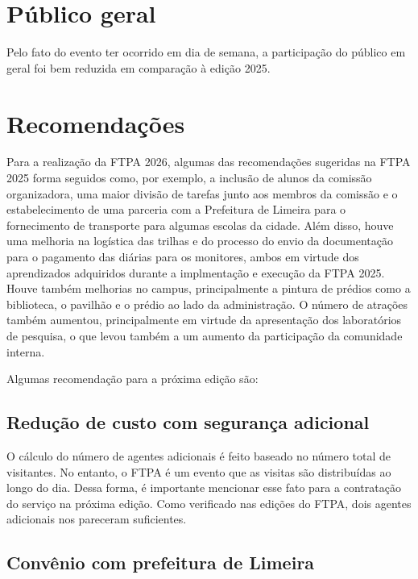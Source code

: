 \documentclass[
  letterpaper,
  DIV=11,
  numbers=noendperiod]{scrreprt}
\begin{document}
\chapter{Público geral}\label{puxfablico-geral}

Pelo fato do evento ter ocorrido em dia de semana, a participação do
público em geral foi bem reduzida em comparação à edição 2025.

\chapter{Recomendações}\label{recomendauxe7uxf5es-1}

Para a realização da FTPA 2026, algumas das recomendações sugeridas na
FTPA 2025 forma seguidos como, por exemplo, a inclusão de alunos da
comissão organizadora, uma maior divisão de tarefas junto aos membros da
comissão e o estabelecimento de uma parceria com a Prefeitura de Limeira
para o fornecimento de transporte para algumas escolas da cidade. Além
disso, houve uma melhoria na logística das trilhas e do processo do
envio da documentação para o pagamento das diárias para os monitores,
ambos em virtude dos aprendizados adquiridos durante a implmentação e
execução da FTPA 2025. Houve também melhorias no campus, principalmente
a pintura de prédios como a biblioteca, o pavilhão e o prédio ao lado da
administração. O número de atrações também aumentou, principalmente em
virtude da apresentação dos laboratórios de pesquisa, o que levou também
a um aumento da participação da comunidade interna.

Algumas recomendação para a próxima edição são:

\section{Redução de custo com segurança
adicional}\label{reduuxe7uxe3o-de-custo-com-seguranuxe7a-adicional}

O cálculo do número de agentes adicionais é feito baseado no número
total de visitantes. No entanto, o FTPA é um evento que as visitas são
distribuídas ao longo do dia. Dessa forma, é importante mencionar esse
fato para a contratação do serviço na próxima edição. Como verificado
nas edições do FTPA, dois agentes adicionais nos pareceram suficientes.

\section{Convênio com prefeitura de
Limeira}\label{convuxeanio-com-prefeitura-de-limeira-1}
\end{document}
